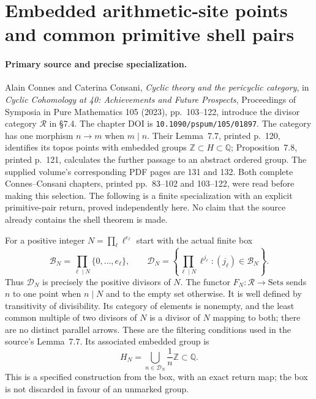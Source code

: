 \section{Embedded arithmetic-site points and common primitive shell pairs}
\label{sec:connes-primitive}

\paragraph{Primary source and precise specialization.}
Alain Connes and Caterina Consani, \emph{Cyclic theory and the pericyclic
category}, in \emph{Cyclic Cohomology at 40: Achievements and Future Prospects},
Proceedings of Symposia in Pure Mathematics 105 (2023), pp.~103--122,
introduce the divisor category $\mathcal R$ in \S7.4.
The chapter DOI is \texttt{10.1090/pspum/105/01897}.
The category has one morphism $n\to m$ when $m\mid n$.
Their Lemma~7.7, printed p.~120, identifies its topos points with embedded
groups $\mathbb Z\subset H\subset\mathbb Q$; Proposition~7.8, printed
p.~121, calculates the further passage to an abstract ordered group.
The supplied volume's corresponding PDF pages are 131 and 132.
Both complete Connes--Consani chapters, printed pp.~83--102 and 103--122,
were read before making this selection.  The following is a finite
specialization with an explicit primitive-pair return, proved independently
here.  No claim that the source already contains the shell theorem is made.

For a positive integer $N=\prod_\ell\ell^{e_\ell}$ start with the actual
finite box
\[
 \mathcal B_N=\prod_{\ell\mid N}\{0,\ldots,e_\ell\},\qquad
 \mathcal D_N=\left\{\prod_{\ell\mid N}\ell^{j_\ell}:
             (j_\ell)\in\mathcal B_N\right\}.
\]
Thus $\mathcal D_N$ is precisely the positive divisors of $N$.
The functor $F_N:\mathcal R\to\mathrm{Sets}$ sends $n$ to one point
when $n\mid N$ and to the empty set otherwise.  It is well defined by
transitivity of divisibility.  Its category of elements is nonempty,
and the least common multiple of two divisors of $N$ is a divisor of $N$
mapping to both; there are no distinct parallel arrows.  These are the
filtering conditions used in the source's Lemma~7.7.  Its associated
embedded group is
\[
 H_N=\bigcup_{n\in\mathcal D_N}\frac1n\mathbb Z\subset\mathbb Q.
\]
This is a specified construction from the box, with an exact return map;
the box is not discarded in favour of an unmarked group.

